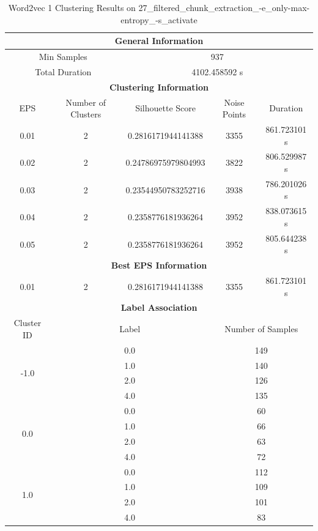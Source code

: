 \begin{longtable}{|c|c|c|c|c|}
\caption{Word2vec 1 Clustering Results on 27\_filtered\_chunk\_extraction\_-e\_only-max-entropy\_-s\_activate} \label{tab:27_filtered_chunk_extraction_-e_only-max-entropy_-s_activate_word2vec_1_clustering_results}\\
\hline
\multicolumn{5}{|c|}{\textbf{General Information}} \\
\hline
\multicolumn{2}{|c|}{Min Samples} & \multicolumn{3}{c|}{937} \\
\multicolumn{2}{|c|}{Total Duration} & \multicolumn{3}{c|}{4102.458592 s} \\
\hline
\multicolumn{5}{|c|}{\textbf{Clustering Information}} \\
\hline
EPS & Number of Clusters & Silhouette Score & Noise Points & Duration \\
0.01 & 2 & 0.2816171944141388 & 3355 & 861.723101 s\\
0.02 & 2 & 0.24786975979804993 & 3822 & 806.529987 s\\
0.03 & 2 & 0.23544950783252716 & 3938 & 786.201026 s\\
0.04 & 2 & 0.2358776181936264 & 3952 & 838.073615 s\\
0.05 & 2 & 0.2358776181936264 & 3952 & 805.644238 s\\
\hline
\multicolumn{5}{|c|}{\textbf{Best EPS Information}} \\
\hline
0.01 & 2 & 0.2816171944141388 & 3355 & 861.723101 s\\
\hline
\multicolumn{5}{|c|}{\textbf{Label Association}} \\
\hline
Cluster ID & \multicolumn{2}{c|}{Label} & \multicolumn{2}{c|}{Number of Samples} \\
\hline
\multirow{4}{*}{-1.0} & \multicolumn{2}{c|}{0.0} & \multicolumn{2}{c|}{149} \\
& \multicolumn{2}{c|}{1.0} & \multicolumn{2}{c|}{140} \\
& \multicolumn{2}{c|}{2.0} & \multicolumn{2}{c|}{126} \\
& \multicolumn{2}{c|}{4.0} & \multicolumn{2}{c|}{135} \\
\hline
\multirow{4}{*}{0.0} & \multicolumn{2}{c|}{0.0} & \multicolumn{2}{c|}{60} \\
& \multicolumn{2}{c|}{1.0} & \multicolumn{2}{c|}{66} \\
& \multicolumn{2}{c|}{2.0} & \multicolumn{2}{c|}{63} \\
& \multicolumn{2}{c|}{4.0} & \multicolumn{2}{c|}{72} \\
\hline
\multirow{4}{*}{1.0} & \multicolumn{2}{c|}{0.0} & \multicolumn{2}{c|}{112} \\
& \multicolumn{2}{c|}{1.0} & \multicolumn{2}{c|}{109} \\
& \multicolumn{2}{c|}{2.0} & \multicolumn{2}{c|}{101} \\
& \multicolumn{2}{c|}{4.0} & \multicolumn{2}{c|}{83} \\
\hline
\end{longtable}


